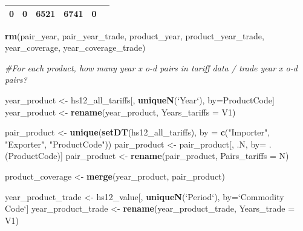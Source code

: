 \documentclass[10pt,]{article}
\newenvironment{Shaded}{\begin{snugshade}}{\end{snugshade}}
\newcommand{\KeywordTok}[1]{\textcolor[rgb]{0.13,0.29,0.53}{\textbf{{#1}}}}
\newcommand{\DataTypeTok}[1]{\textcolor[rgb]{0.13,0.29,0.53}{{#1}}}
\newcommand{\StringTok}[1]{\textcolor[rgb]{0.31,0.60,0.02}{{#1}}}
\newcommand{\CommentTok}[1]{\textcolor[rgb]{0.56,0.35,0.01}{\textit{{#1}}}}
\newcommand{\NormalTok}[1]{{#1}}
\begin{document}
\begin{longtable}[]{@{}cccccc@{}}
\begin{minipage}[t]{0.19\columnwidth}
0\strut
\end{minipage} & \begin{minipage}[t]{0.16\columnwidth}\centering\strut
0\strut
\end{minipage} & \begin{minipage}[t]{0.17\columnwidth}\centering\strut
6521\strut
\end{minipage} & \begin{minipage}[t]{0.14\columnwidth}\centering\strut
6741\strut
\end{minipage} & \begin{minipage}[t]{0.10\columnwidth}\centering\strut
0\strut
\end{minipage}\tabularnewline
\bottomrule
\end{longtable}

\begin{Shaded}
\begin{Highlighting}[]
\KeywordTok{rm}\NormalTok{(pair_year, pair_year_trade, product_year, product_year_trade, year_coverage, year_coverage_trade)}

\CommentTok{#For each product, how many year x o-d pairs in tariff data / trade year x o-d pairs?}

\NormalTok{year_product <-}\StringTok{ }\NormalTok{hs12_all_tariffs[, }\KeywordTok{uniqueN}\NormalTok{(}\StringTok{`}\DataTypeTok{Year}\StringTok{`}\NormalTok{), by=ProductCode]}
\NormalTok{year_product <-}\StringTok{ }\KeywordTok{rename}\NormalTok{(year_product, }\DataTypeTok{Years_tariffs =} \NormalTok{V1)}

\NormalTok{pair_product <-}\StringTok{ }\KeywordTok{unique}\NormalTok{(}\KeywordTok{setDT}\NormalTok{(hs12_all_tariffs), }\DataTypeTok{by =} \KeywordTok{c}\NormalTok{(}\StringTok{"Importer"}\NormalTok{, }\StringTok{"Exporter"}\NormalTok{, }\StringTok{"ProductCode"}\NormalTok{))}
\NormalTok{pair_product <-}\StringTok{ }\NormalTok{pair_product[, .N, by=}\StringTok{ }\NormalTok{.(ProductCode)]}
\NormalTok{pair_product <-}\StringTok{ }\KeywordTok{rename}\NormalTok{(pair_product, }\DataTypeTok{Pairs_tariffs =} \NormalTok{N)}

\NormalTok{product_coverage <-}\StringTok{ }\KeywordTok{merge}\NormalTok{(year_product, pair_product)}

\NormalTok{year_product_trade <-}\StringTok{ }\NormalTok{hs12_value[, }\KeywordTok{uniqueN}\NormalTok{(}\StringTok{`}\DataTypeTok{Period}\StringTok{`}\NormalTok{), by=}\StringTok{`}\DataTypeTok{Commodity Code}\StringTok{`}\NormalTok{]}
\NormalTok{year_product_trade <-}\StringTok{ }\KeywordTok{rename}\NormalTok{(year_product_trade, }\DataTypeTok{Years_trade =} \NormalTok{V1)}


\end{Highlighting}
\end{Shaded}
\end{document}
